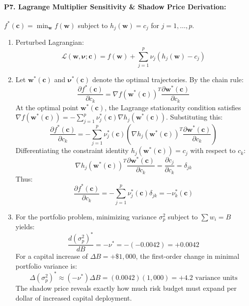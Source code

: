 \paragraph{P7. Lagrange Multiplier Sensitivity \& Shadow Price Derivation:}
$f^*(\mathbf{c}) = \min_{\mathbf{w}} f(\mathbf{w})$ subject to $h_j(\mathbf{w}) = c_j$ for $j = 1, \dots, p$.
\begin{enumerate}[label=(\alph*)]
    \item Perturbed Lagrangian:
    \begin{equation*}
    \mathcal{L}(\mathbf{w}, \boldsymbol{\nu}; \mathbf{c}) = f(\mathbf{w}) + \sum_{j=1}^p \nu_j (h_j(\mathbf{w}) - c_j)
    \end{equation*}
    \item Let $\mathbf{w}^*(\mathbf{c})$ and $\boldsymbol{\nu}^*(\mathbf{c})$ denote the optimal trajectories. By the chain rule:
    \begin{equation*}
    \frac{\partial f^*(\mathbf{c})}{\partial c_k} = \nabla f(\mathbf{w}^*(\mathbf{c}))^T \frac{\partial \mathbf{w}^*(\mathbf{c})}{\partial c_k}
    \end{equation*}
    At the optimal point $\mathbf{w}^*(\mathbf{c})$, the Lagrange stationarity condition satisfies $\nabla f(\mathbf{w}^*(\mathbf{c})) = -\sum_{j=1}^p \nu_j^*(\mathbf{c}) \nabla h_j(\mathbf{w}^*(\mathbf{c}))$. Substituting this:
    \begin{equation*}
    \frac{\partial f^*(\mathbf{c})}{\partial c_k} = -\sum_{j=1}^p \nu_j^*(\mathbf{c}) \left( \nabla h_j(\mathbf{w}^*(\mathbf{c}))^T \frac{\partial \mathbf{w}^*(\mathbf{c})}{\partial c_k} \right)
    \end{equation*}
    Differentiating the constraint identity $h_j(\mathbf{w}^*(\mathbf{c})) = c_j$ with respect to $c_k$:
    \begin{equation*}
    \nabla h_j(\mathbf{w}^*(\mathbf{c}))^T \frac{\partial \mathbf{w}^*(\mathbf{c})}{\partial c_k} = \frac{\partial c_j}{\partial c_k} = \delta_{jk}
    \end{equation*}
    Thus:
    \begin{equation*}
    \frac{\partial f^*(\mathbf{c})}{\partial c_k} = -\sum_{j=1}^p \nu_j^*(\mathbf{c}) \delta_{jk} = -\nu_k^*(\mathbf{c})
    \end{equation*}
    \item For the portfolio problem, minimizing variance $\sigma_p^2$ subject to $\sum w_i = B$ yields:
    \begin{equation*}
    \frac{d (\sigma_p^2)^*}{dB} = -\nu^* = -(-0.0042) = +0.0042
    \end{equation*}
    For a capital increase of $\Delta B = +\$1{,}000$, the first-order change in minimal portfolio variance is:
    \begin{equation*}
    \Delta (\sigma_p^2)^* \approx (-\nu^*) \Delta B = (0.0042)(1{,}000) = +4.2 \text{ variance units}
    \end{equation*}
    The shadow price reveals exactly how much risk budget must expand per dollar of increased capital deployment.
\end{enumerate}

